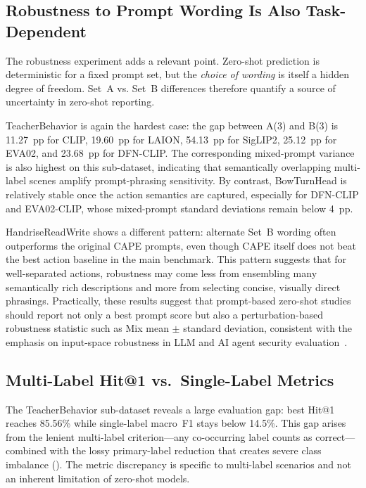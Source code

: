 \documentclass[symmetry,article,submit,pdftex,moreauthors]{Definitions/mdpi}
\begin{document}
\subsection{Robustness to Prompt Wording Is Also Task-Dependent}

The robustness experiment adds a relevant point. Zero-shot prediction is deterministic for a fixed prompt set, but the \emph{choice of wording} is itself a hidden degree of freedom. Set~A vs. Set~B differences therefore quantify a source of uncertainty in zero-shot reporting.

TeacherBehavior is again the hardest case: the gap between A(3) and B(3) is 11.27~pp for CLIP, 19.60~pp for LAION, 54.13~pp for SigLIP2, 25.12~pp for EVA02, and 23.68~pp for DFN-CLIP. The corresponding mixed-prompt variance is also highest on this sub-dataset, indicating that semantically overlapping multi-label scenes amplify prompt-phrasing sensitivity. By contrast, BowTurnHead is relatively stable once the action semantics are captured, especially for DFN-CLIP and EVA02-CLIP, whose mixed-prompt standard deviations remain below 4~pp.

HandriseReadWrite shows a different pattern: alternate Set~B wording often outperforms the original CAPE prompts, even though CAPE itself does not beat the best action baseline in the main benchmark. This pattern suggests that for well-separated actions, robustness may come less from ensembling many semantically rich descriptions and more from selecting concise, visually direct phrasings. Practically, these results suggest that prompt-based zero-shot studies should report not only a best prompt score but also a perturbation-based robustness statistic such as Mix mean $\pm$ standard deviation, consistent with the emphasis on input-space robustness in LLM and AI agent security evaluation~\cite{zhou2025security_llm,deng2025ai_agents}.

\subsection{Multi-Label Hit@1 vs.\ Single-Label Metrics}
\label{sec:metric_gap}

The TeacherBehavior sub-dataset reveals a large evaluation gap: best Hit@1 reaches 85.56\% while single-label macro~F1 stays below 14.5\%.
This gap arises from the lenient multi-label criterion---any co-occurring label counts as correct---combined with the lossy primary-label reduction that creates severe class imbalance (). The metric discrepancy is specific to multi-label scenarios and not an inherent limitation of zero-shot models.
\end{document}
